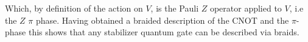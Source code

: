 \documentclass{article}
\begin{document}
Which, by definition of the action on $V$, is the Pauli $Z$ operator applied to $V$, i.e the $Z$ $\pi$ phase. Having obtained a braided description of the CNOT and the $\pi$-phase this shows that any stabilizer quantum gate can be described via braids. 



\end{document}
